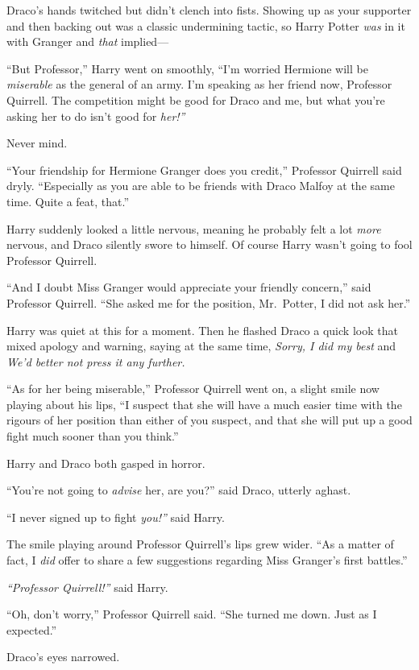 Draco's hands twitched but didn't clench into fists. Showing up as your
supporter and then backing out was a classic undermining tactic, so
Harry Potter \emph{was} in it with Granger and \emph{that} implied---

``But Professor,'' Harry went on smoothly, ``I'm worried Hermione will
be \emph{miserable} as the general of an army. I'm speaking as her
friend now, Professor Quirrell. The competition might be good for Draco
and me, but what you're asking her to do isn't good for \emph{her!''}

Never mind.

``Your friendship for Hermione Granger does you credit,'' Professor
Quirrell said dryly. ``Especially as you are able to be friends with
Draco Malfoy at the same time. Quite a feat, that.''

Harry suddenly looked a little nervous, meaning he probably felt a lot
\emph{more} nervous, and Draco silently swore to himself. Of course
Harry wasn't going to fool Professor Quirrell.

``And I doubt Miss Granger would appreciate your friendly concern,''
said Professor Quirrell. ``She asked me for the position, Mr.~Potter, I
did not ask her.''

Harry was quiet at this for a moment. Then he flashed Draco a quick look
that mixed apology and warning, saying at the same time, \emph{Sorry, I
did my best} and \emph{We'd better not press it any further.}

``As for her being miserable,'' Professor Quirrell went on, a slight
smile now playing about his lips, ``I suspect that she will have a much
easier time with the rigours of her position than either of you suspect,
and that she will put up a good fight much sooner than you think.''

Harry and Draco both gasped in horror.

``You're not going to \emph{advise} her, are you?'' said Draco, utterly
aghast.

``I never signed up to fight \emph{you!''} said Harry.

The smile playing around Professor Quirrell's lips grew wider. ``As a
matter of fact, I \emph{did} offer to share a few suggestions regarding
Miss Granger's first battles.''

\emph{``Professor Quirrell!''} said Harry.

``Oh, don't worry,'' Professor Quirrell said. ``She turned me down. Just
as I expected.''

Draco's eyes narrowed.

